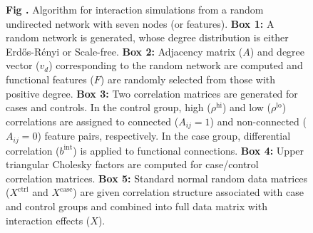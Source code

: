 \documentclass[10pt,letterpaper]{article}\usepackage[]{graphicx}\usepackage[]{color}
\begin{document}
\begin{figure}[H]
\centering
\begin{minipage}[h]{1\textwidth}
\end{minipage}

\begin{minipage}[h]{1\textwidth}
	\noindent{}\textbf{Fig \thefigure \label{fig:interaction_simulation_diagram}.} Algorithm for interaction simulations from a random undirected network with seven nodes (or features). \textbf{Box 1:} A random network is generated, whose degree distribution is either Erd\H{o}s-R\'{e}nyi or Scale-free. \textbf{Box 2:} Adjacency matrix ($A$) and degree vector ($v_d$) corresponding to the random network are computed and functional features ($F$) are randomly selected from those with positive degree. \textbf{Box 3:} Two correlation matrices are generated for cases and controls. In the control group, high ($\rho^\text{hi}$) and low ($\rho^\text{lo}$) correlations are assigned to connected ($A_{ij}=1$) and non-connected ($A_{ij}=0$) feature pairs, respectively. In the case group, differential correlation ($b^\text{int}$) is applied to functional connections. \textbf{Box 4:} Upper triangular Cholesky factors are computed for case/control correlation matrices. \textbf{Box 5:} Standard normal random data matrices ($X^\text{ctrl}$ and $X^\text{case}$) are given correlation structure associated with case and control groups and combined into full data matrix with interaction effects ($X$).
\end{minipage}
\end{figure}
\end{document}
